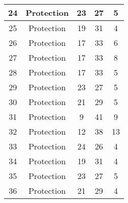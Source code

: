 \documentclass[results.tex]{subfiles}
\begin{document}
\begin{center}
\begin{tabular}{| c || c | c | c | c |}
            \hline
            24                      & Protection                   & 23                     & 27                      & 5                    \\
            \hline
            25                      & Protection                   & 19                     & 31                      & 4                    \\
            \hline
            26                      & Protection                   & 17                     & 33                      & 6                    \\
            \hline
            27                      & Protection                   & 17                     & 33                      & 8                    \\
            \hline
            28                      & Protection                   & 17                     & 33                      & 5                    \\
            \hline
            29                      & Protection                   & 23                     & 27                      & 5                    \\
            \hline
            30                      & Protection                   & 21                     & 29                      & 5                    \\
            \hline
            31                      & Protection                   & 9                      & 41                      & 9                    \\
            \hline
            32                      & Protection                   & 12                     & 38                      & 13                   \\
            \hline
            33                      & Protection                   & 24                     & 26                      & 4                    \\
            \hline
            34                      & Protection                   & 19                     & 31                      & 4                    \\
            \hline
            35                      & Protection                   & 23                     & 27                      & 5                    \\
            \hline
            36                      & Protection                   & 21                     & 29                      & 4                    \\

\end{tabular}
\end{center}
\end{document}
